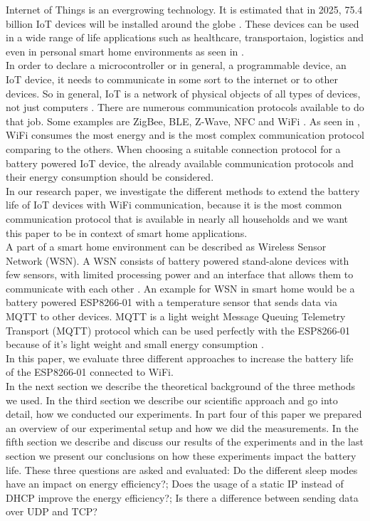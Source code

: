 Internet of Things is an evergrowing technology. It is estimated that in 2025, 75.4 billion IoT devices will be installed around the globe \cite{lucero2016iot}. These devices can be used in a wide range of life applications such as healthcare, transportaion, logistics and even in personal smart home environments as seen in \cite{6803174}.\\  
In order to declare a microcontroller or in general, a programmable device, an IoT device, it needs to communicate in some sort to the internet or to other devices. So in general, IoT is a network of physical objects of all types of devices, not just computers \cite{patel2016internet}. There are numerous communication protocols available to do that job. Some examples are ZigBee, BLE, Z-Wave, NFC and WiFi \cite{8079928}. As seen in \cite{8088226}, WiFi consumes the most energy and is the most complex communication protocol comparing to the others.  
When choosing a suitable connection protocol for a battery powered IoT device, the already available communication protocols and their energy consumption should be considered.\\
In our research paper, we investigate the different methods to extend the battery life of IoT devices with WiFi communication, because it is the most common communication protocol that is available in nearly all households and we want this paper to be in context of smart home applications.\\
A part of a smart home environment can be described as Wireless Sensor Network (WSN). A WSN consists of battery powered stand-alone devices with few sensors, with limited processing power and an interface that allows them to communicate with each other \cite{wsn}. 
An example for WSN in smart home would be a battery powered ESP8266-01 with a temperature sensor that sends data via MQTT to other devices.
MQTT is a light weight Message Queuing Telemetry Transport (MQTT) protocol which can be used perfectly with the ESP8266-01 because of it's light weight and small energy consumption \cite{kodali_mqtt_2016}.\\
In this paper, we evaluate three different approaches to increase the battery life of the ESP8266-01 connected to WiFi.\\
In the next section we describe the theoretical background of the three methods we used. 
In the third section we describe our scientific approach and go into detail, how we conducted our experiments.
In part four of this paper we prepared an overview of our experimental setup and how we did the measurements.
In the fifth section we describe and discuss our results of the experiments and in the last section we present our conclusions on how these experiments impact the battery life.
These three questions are asked and evaluated: Do the different sleep modes have an impact on energy efficiency?; Does the usage of a static IP instead of DHCP improve the energy efficiency?; Is there a difference between sending data over UDP and TCP?
